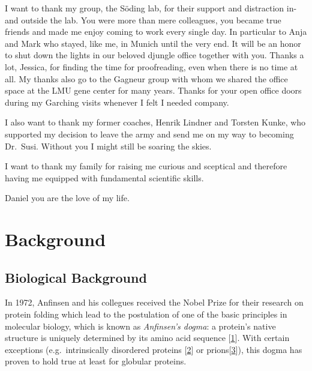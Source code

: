 \documentclass[11pt,a4paper,twoside]{book}
\theoremstyle{definition}
\theoremstyle{definition}
\theoremstyle{remark}
\begin{document}
I want to thank my group, the Söding lab, for their support and
distraction in- and outside the lab. You were more than mere colleagues,
you became true friends and made me enjoy coming to work every single
day. In particular to Anja and Mark who stayed, like me, in Munich until
the very end. It will be an honor to shut down the lights in our beloved
djungle office together with you. Thanks a lot, Jessica, for finding the
time for proofreading, even when there is no time at all. My thanks also
go to the Gagneur group with whom we shared the office space at the LMU
gene center for many years. Thanks for your open office doors during my
Garching visits whenever I felt I needed company.

I also want to thank my former coaches, Henrik Lindner and Torsten
Kunke, who supported my decision to leave the army and send me on my way
to becoming Dr.~Susi. Without you I might still be soaring the skies.

I want to thank my family for raising me curious and sceptical and
therefore having me equipped with fundamental scientific skills.

Daniel you are the love of my life.

\tableofcontents
{}

\mainmatter \setcounter{page}{1}

\chapter{Background}\label{background}

\section{Biological Background}\label{general-intro}

In 1972, Anfinsen and his collegues received the Nobel Prize for their
research on protein folding which lead to the postulation of one of the
basic principles in molecular biology, which is known as
\emph{Anfinsen's dogma}: a protein's native structure is uniquely
determined by its amino acid sequence
{[}\protect\hyperlink{ref-Anfinsen1973}{1}{]}. With certain exceptions
(e.g.~intrinsically disordered proteins
{[}\protect\hyperlink{ref-Wright1999}{2}{]} or
prions{[}\protect\hyperlink{ref-Fraser2014}{3}{]}), this dogma has
proven to hold true at least for globular proteins.
\end{document}
